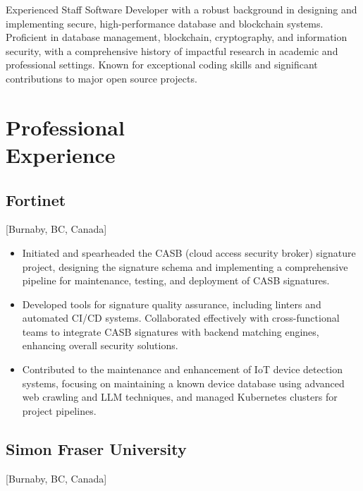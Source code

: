 \documentclass{mycv}
\begin{document}
\maketitle%

\begin{summary}
Experienced Staff Software Developer with a robust background in designing and implementing secure, high-performance database and blockchain systems. Proficient in database management, blockchain, cryptography, and information security, with a comprehensive history of impactful research in academic and professional settings. Known for exceptional coding skills and significant contributions to major open source projects.
\end{summary}

\section{Professional \\ Experience}

\subsection{Fortinet}[Burnaby, BC, Canada]
\begin{positions}
\end{positions}

\begin{itemize}
  \item Initiated and spearheaded the CASB (cloud access security broker) signature project, designing the signature schema and implementing a comprehensive pipeline for maintenance, testing, and deployment of CASB signatures.
  \item Developed tools for signature quality assurance, including linters and automated CI/CD systems. Collaborated effectively with cross-functional teams to integrate CASB signatures with backend matching engines, enhancing overall security solutions.
  \item Contributed to the maintenance and enhancement of IoT device detection systems, focusing on maintaining a known device database using advanced web crawling and LLM techniques, and managed Kubernetes clusters for project pipelines.
\end{itemize}

\subsection{Simon Fraser University}[Burnaby, BC, Canada]
\begin{positions}
\end{positions}
\end{document}
